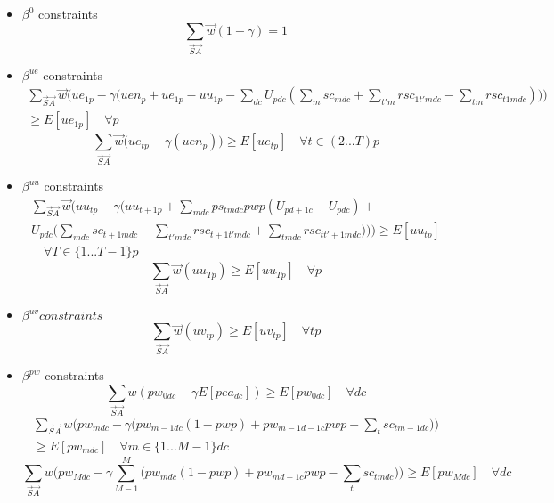 \documentclass{article}
\begin{document}
\begin{itemize}
	\item $\beta^{0}$ constraints
	\begin{equation}
		\sum_{\vec{S}\vec{A}}\vec{w} (1 - \gamma) = 1 
	\end{equation}
	
	\item $\beta^{ue}$ constraints	
	\begin{multline}
		\sum_{\vec{S}\vec{A}}\vec{w} \bigg(ue_{1p} - 
			\gamma \Big( uen_{p} + ue_{1p} - uu_{1p} - 
			\sum_{dc} U_{pdc} ( \sum_{m} sc_{mdc} + \sum_{t'm} rsc_{1t'mdc} - \sum_{tm} rsc_{t1mdc}) \Big) \bigg) \\ 
		\ge E[ue_{1p}] \quad \forall p
	\end{multline}
	\begin{equation}
		\sum_{\vec{S}\vec{A}}\vec{w} \Big(ue_{tp} - \gamma (uen_{p}) \Big) \ge E[ue_{tp}] \quad \forall t \in (2...T) p
	\end{equation}	
	
	\item $\beta^{uu}$ constraints
	\begin{multline}
		\sum_{\vec{S}\vec{A}} \vec{w} \bigg( 
			uu_{tp}	 - \gamma \Big( uu_{t+1p} + \sum_{mdc} ps_{tmdc}pwp (U_{pd+1c} - U_{pdc}) + \\ 
			U_{pdc} \big( \sum_{mdc} sc_{t+1mdc}  - \sum_{t'mdc} rsc_{t+1t'mdc} + \sum_{tmdc} rsc_{tt'+1mdc} \big) \Big)
		\bigg) \ge E[uu_{tp}] \\
		\quad \forall T \in \{1...T-1\}p
	\end{multline}
	\begin{equation}
		\sum_{\vec{S}\vec{A}} \vec{w} (uu_{Tp}) \ge E[uu_{Tp}] \quad \forall p
	\end{equation}

	\item $\beta^{uv} constraints$
	\begin{equation}
		\sum_{\vec{S}\vec{A}} \vec{w} (uv_{tp}) \ge E[uv_{tp}] \quad \forall tp
	\end{equation}
	
	\item $\beta^{pw}$ constraints
	\begin{equation}
		  \sum_{\vec{S}\vec{A}}w  ( pw_{0dc} - \gamma E[pea_{dc}]) \ge E[pw_{0dc}] \quad \forall dc
	\end{equation}
	\begin{multline}
		\sum_{\vec{S}\vec{A}}w  \Big( pw_{mdc} - \gamma \big( pw_{m-1dc} (1 - pwp) + pw_{m-1d-1c} pwp - \sum_{t} sc_{tm-1dc} \big) \Big) \\ 
		\ge E[pw_{mdc}]  \quad \forall m \in \{1 ... M-1 \}dc
	\end{multline}
	\begin{equation}
		\sum_{\vec{S}\vec{A}}w  \Big( pw_{Mdc} - \gamma \sum_{M-1}^{M}
			\big( pw_{mdc} (1 - pwp) + pw_{md-1c} pwp - \sum_{t} sc_{tmdc} \big) \Big) \ge E[pw_{Mdc}] \quad \forall dc
	\end{equation}
	

\end{itemize}
\end{document}
